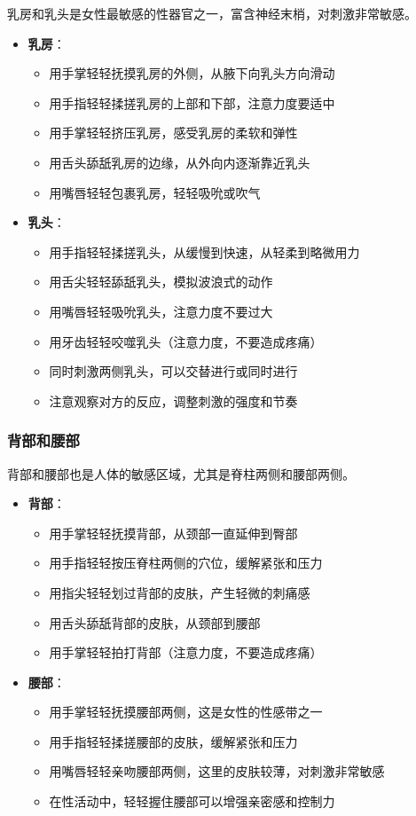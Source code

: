 \documentclass[12pt,UTF8]{ctexbook}
\begin{document}
乳房和乳头是女性最敏感的性器官之一，富含神经末梢，对刺激非常敏感。

\begin{itemize}
\item \textbf{乳房}：
  \begin{itemize}
  \item 用手掌轻轻抚摸乳房的外侧，从腋下向乳头方向滑动
  \item 用手指轻轻揉搓乳房的上部和下部，注意力度要适中
  \item 用手掌轻轻挤压乳房，感受乳房的柔软和弹性
  \item 用舌头舔舐乳房的边缘，从外向内逐渐靠近乳头
  \item 用嘴唇轻轻包裹乳房，轻轻吸吮或吹气
  \end{itemize}
\item \textbf{乳头}：
  \begin{itemize}
  \item 用手指轻轻揉搓乳头，从缓慢到快速，从轻柔到略微用力
  \item 用舌尖轻轻舔舐乳头，模拟波浪式的动作
  \item 用嘴唇轻轻吸吮乳头，注意力度不要过大
  \item 用牙齿轻轻咬噬乳头（注意力度，不要造成疼痛）
  \item 同时刺激两侧乳头，可以交替进行或同时进行
  \item 注意观察对方的反应，调整刺激的强度和节奏
  \end{itemize}
\end{itemize}

\subsubsection{背部和腰部}

背部和腰部也是人体的敏感区域，尤其是脊柱两侧和腰部两侧。

\begin{itemize}
\item \textbf{背部}：
  \begin{itemize}
  \item 用手掌轻轻抚摸背部，从颈部一直延伸到臀部
  \item 用手指轻轻按压脊柱两侧的穴位，缓解紧张和压力
  \item 用指尖轻轻划过背部的皮肤，产生轻微的刺痛感
  \item 用舌头舔舐背部的皮肤，从颈部到腰部
  \item 用手掌轻轻拍打背部（注意力度，不要造成疼痛）
  \end{itemize}
\item \textbf{腰部}：
  \begin{itemize}
  \item 用手掌轻轻抚摸腰部两侧，这是女性的性感带之一
  \item 用手指轻轻揉搓腰部的皮肤，缓解紧张和压力
  \item 用嘴唇轻轻亲吻腰部两侧，这里的皮肤较薄，对刺激非常敏感
  \item 在性活动中，轻轻握住腰部可以增强亲密感和控制力
  \end{itemize}
\end{itemize}
\end{document}

